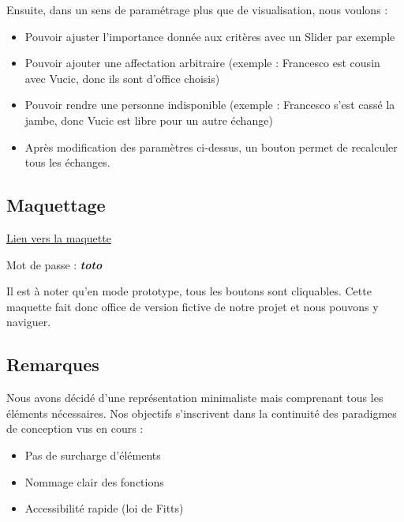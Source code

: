 \documentclass{mytex}
\begin{document}
Ensuite, dans un sens de paramétrage plus que de visualisation, nous voulons :

\begin{itemize}
	\item Pouvoir ajuster l'importance donnée aux critères avec un Slider par exemple
	\item Pouvoir ajouter une affectation arbitraire (exemple : Francesco est cousin avec Vucic, donc ils sont d'office choisis)
	\item Pouvoir rendre une personne indisponible (exemple : Francesco s'est cassé la jambe, donc Vucic est libre pour un autre échange)
	\item Après modification des paramètres ci-dessus, un bouton permet de recalculer tous les échanges.
\end{itemize}

\subsection{Maquettage}

\href{https://www.figma.com/design/2Noh9uxhnhdc1NaLDf3kzv/S2.01?m=auto&t=Z172zrYuezvwgMeP-1}{Lien vers la maquette}

Mot de passe : \textbf{\textit{toto}}

Il est à noter qu'en mode prototype, tous les boutons sont cliquables.
Cette maquette fait donc office de version fictive de notre projet et nous pouvons y naviguer.



\subsection{Remarques}

Nous avons décidé d'une représentation minimaliste mais comprenant tous les éléments nécessaires. 
Nos objectifs s'inscrivent dans la continuité des paradigmes de conception vus en cours :

\begin{itemize}
	\item Pas de surcharge d'éléments
	\item Nommage clair des fonctions
	\item Accessibilité rapide (loi de Fitts)
\end{itemize}


\end{document}

